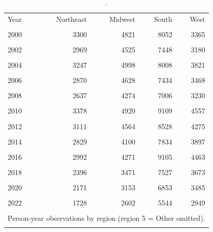 \begin{table}[htbp]\centering
\caption{.}
\label{tab:region_group_counts_by_year}
\begin{tabular}{lrrrr}\toprule
Year & Northeast & Midwest & South & West \\\\ \midrule
2000 & 3300 & 4821 & 8052 & 3365 \\\\
2002 & 2969 & 4525 & 7448 & 3180 \\\\
2004 & 3247 & 4998 & 8008 & 3821 \\\\
2006 & 2870 & 4628 & 7434 & 3468 \\\\
2008 & 2637 & 4274 & 7006 & 3230 \\\\
2010 & 3378 & 4920 & 9109 & 4557 \\\\
2012 & 3111 & 4564 & 8528 & 4275 \\\\
2014 & 2829 & 4100 & 7834 & 3897 \\\\
2016 & 2992 & 4271 & 9105 & 4463 \\\\
2018 & 2396 & 3471 & 7527 & 3673 \\\\
2020 & 2171 & 3153 & 6853 & 3485 \\\\
2022 & 1728 & 2602 & 5544 & 2949 \\\\
\bottomrule
\multicolumn{5}{l}{\footnotesize Person-year observations by region (region 5 = Other omitted).} \\\\
\end{tabular}\end{table}
